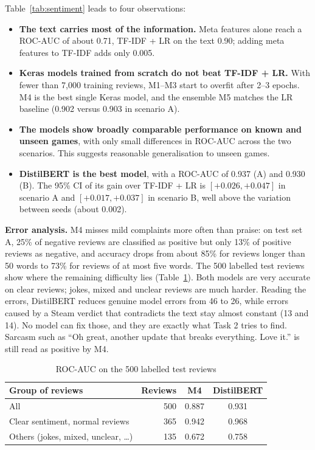 Table~\ref{tab:sentiment} leads to four observations:
\begin{itemize}
    \item \textbf{The text carries most of the information.} Meta features alone reach a ROC-AUC of about 0.71, TF-IDF + LR on the text 0.90; adding meta features to TF-IDF adds only 0.005.
    \item \textbf{Keras models trained from scratch do not beat TF-IDF + LR.} With fewer than 7,000 training reviews, M1--M3 start to overfit after 2--3 epochs. M4 is the best single Keras model, and the ensemble M5 matches the LR baseline (0.902 versus 0.903 in scenario A).
    \item \textbf{The models show broadly comparable performance on known and unseen games}, with only small differences in ROC-AUC across the two scenarios. This suggests reasonable generalisation to unseen games.
    \item \textbf{DistilBERT is the best model}, with a ROC-AUC of 0.937 (A) and 0.930 (B). The 95\% CI of its gain over TF-IDF + LR is $[+0.026, +0.047]$ in scenario A and $[+0.017, +0.037]$ in scenario B, well above the variation between seeds (about 0.002).
\end{itemize}

\textbf{Error analysis.} M4 misses mild complaints more often than praise: on test set A, 25\% of negative reviews are classified as positive but only 13\% of positive reviews as negative, and accuracy drops from about 85\% for reviews longer than 50 words to 73\% for reviews of at most five words. The 500 labelled test reviews show where the remaining difficulty lies (Table~\ref{tab:erroranalysis}). Both models are very accurate on clear reviews; jokes, mixed and unclear reviews are much harder. Reading the errors, DistilBERT reduces genuine model errors from 46 to 26, while errors caused by a Steam verdict that contradicts the text stay almost constant (13 and 14). No model can fix those, and they are exactly what Task 2 tries to find. Sarcasm such as ``Oh great, another update that breaks everything. Love it.'' is still read as positive by M4.

\begin{table}[!htbp]
\centering
\caption{ROC-AUC on the 500 labelled test reviews}
\label{tab:erroranalysis}
\begin{tabular}{lrcc}
\toprule
\textbf{Group of reviews} & \textbf{Reviews} & \textbf{M4} & \textbf{DistilBERT} \\
\midrule
All & 500 & 0.887 & 0.931 \\
Clear sentiment, normal reviews & 365 & 0.942 & 0.968 \\
Others (jokes, mixed, unclear, \ldots) & 135 & 0.672 & 0.758 \\
\bottomrule
\end{tabular}
\end{table}

